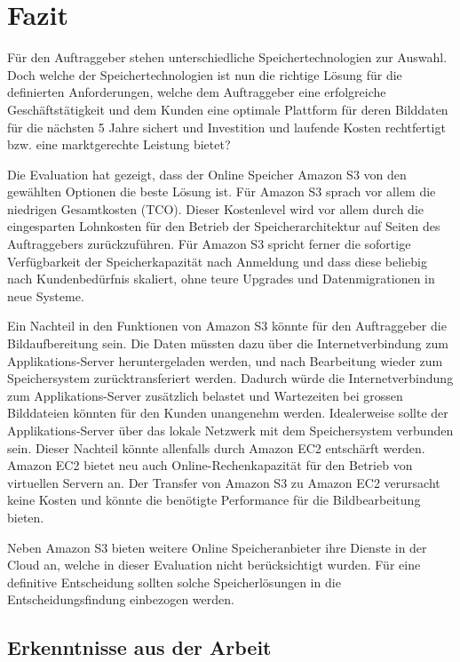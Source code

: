 \cleardoublepage
\chapter{Fazit}

Für den Auftraggeber stehen unterschiedliche Speichertechnologien zur Auswahl. Doch welche der Speichertechnologien ist nun die richtige Lösung für die definierten Anforderungen, welche dem Auftraggeber eine erfolgreiche Geschäftstätigkeit und dem Kunden eine optimale Plattform für deren Bilddaten für die nächsten 5 Jahre sichert und Investition und laufende Kosten rechtfertigt bzw. eine marktgerechte Leistung bietet?

Die Evaluation hat gezeigt, dass der Online Speicher Amazon S3 von den gewählten Optionen die beste Lösung ist. Für Amazon S3 sprach vor allem die niedrigen Gesamtkosten (TCO). Dieser Kostenlevel wird vor allem durch die eingesparten Lohnkosten für den Betrieb der Speicherarchitektur auf Seiten des Auftraggebers zurückzuführen. Für Amazon S3 spricht ferner die sofortige Verfügbarkeit der Speicherkapazität nach Anmeldung und dass diese beliebig nach Kundenbedürfnis skaliert, ohne teure Upgrades und Datenmigrationen in neue Systeme.

Ein Nachteil in den Funktionen von Amazon S3 könnte für den Auftraggeber die Bildaufbereitung sein. Die Daten müssten dazu über die Internetverbindung zum Applikations-Server heruntergeladen werden, und nach Bearbeitung wieder zum Speichersystem zurücktransferiert werden. Dadurch würde die Internetverbindung zum Applikations-Server zusätzlich belastet und Wartezeiten bei grossen Bilddateien könnten für den Kunden unangenehm werden. Idealerweise sollte der Applikations-Server über das lokale Netzwerk mit dem Speichersystem verbunden sein. Dieser Nachteil könnte allenfalls durch Amazon EC2 entschärft werden. Amazon EC2 bietet neu auch Online-Rechenkapazität für den Betrieb von virtuellen Servern an. Der Transfer von Amazon S3 zu Amazon EC2 verursacht keine Kosten und könnte die benötigte Performance für die Bildbearbeitung bieten.

Neben Amazon S3 bieten weitere Online Speicheranbieter ihre Dienste in der Cloud an, welche in dieser Evaluation nicht berücksichtigt wurden. Für eine definitive Entscheidung sollten solche Speicherlösungen in die Entscheidungsfindung einbezogen werden.



\section{Erkenntnisse aus der Arbeit}

